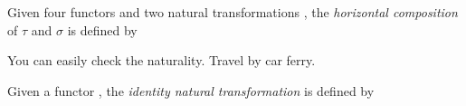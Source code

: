 \begin{definition}
Given four functors
and two natural transformations
, the \emph{horizontal composition} of $\tau$ and $\sigma$
is defined by
\end{definition}
You can easily check the naturality. Travel by car ferry.


\begin{definition}
Given a functor
, the \emph{identity natural transformation}
is defined by
\end{definition}

